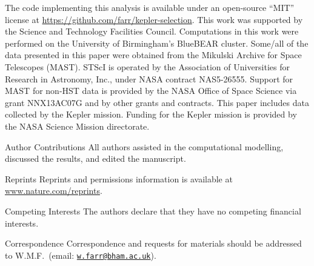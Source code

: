 \documentclass{nature}
\newcommand{\email}[1]{\href{mailto:#1}{\nolinkurl{#1}}}
\begin{document}


\begin{addendum}
\item The code implementing this analysis is available under an
  open-source ``MIT'' license at
  \url{https://github.com/farr/kepler-selection}.  This work was
  supported by the Science and Technology Facilities Council.
  Computations in this work were performed on the University of
  Birmingham's BlueBEAR cluster.  Some/all of the data presented in
  this paper were obtained from the Mikulski Archive for Space
  Telescopes (MAST). STScI is operated by the Association of
  Universities for Research in Astronomy, Inc., under NASA contract
  NAS5-26555. Support for MAST for non-HST data is provided by the
  NASA Office of Space Science via grant NNX13AC07G and by other
  grants and contracts.  This paper includes data collected by the
  Kepler mission. Funding for the Kepler mission is provided by the
  NASA Science Mission directorate.
\item [Author Contributions] All authors assisted in the computational
  modelling, discussed the results, and edited the manuscript.
\item [Reprints] Reprints and permissions information is available at
  \url{www.nature.com/reprints}.
\item[Competing Interests] The authors declare that they have no
  competing financial interests.
\item[Correspondence] Correspondence and requests for materials should
  be addressed to W.M.F.\ (email: \email{w.farr@bham.ac.uk}).
\end{addendum}
\end{document}

